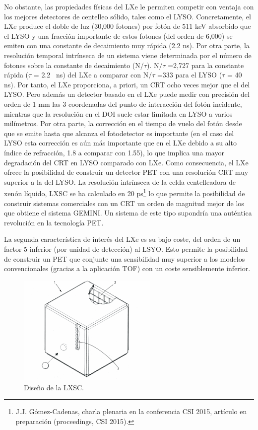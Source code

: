 No obstante, las propiedades físicas del LXe le permiten competir con ventaja con los mejores detectores de centelleo sólido, tales como el LYSO. Concretamente, el LXe produce el doble de luz (30,000 fotones) por fotón de 511 keV absorbido que el LYSO y una fracción importante de estos fotones (del orden de 6,000) se emiten con una constante de decaimiento muy rápida (2.2 ns). Por otra parte, la resolución temporal intrínseca de un sistema viene determinada por el número de fotones sobre la constante de decaimiento (N/$\tau$). N$/\tau$ =2,727 para la constante rápida ($\tau$ = 2.2~ ns) del LXe a comparar con N/$\tau$ =333 para el LYSO ($\tau$ = 40~ ns). Por tanto, el LXe proporciona, a priori, un CRT ocho veces mejor que el del LYSO. Pero además un detector basado en el LXe puede medir con precisión del orden de 1 mm las 3 coordenadas del punto de interacción del fotón incidente, mientras que la resolución en el DOI suele estar limitada en LYSO a varios milímetros. Por otra parte, la corrección en el tiempo de vuelo del fotón desde que se emite hasta que alcanza el fotodetector es importante (en el caso del LYSO esta corrección es aún más importante que en el LXe debido a su alto índice de refracción, 1.8 a comparar con 1.55), lo que implica una mayor degradación del CRT en LYSO comparado con LXe. Como consecuencia, el LXe ofrece la posibilidad de construir un detector PET con una resolución CRT muy superior a la del LYSO. La resolución intrínseca de la celda centelleadora de xenón líquido, LXSC  se ha calculado en 20 ps\footnote{J.J. Gómez-Cadenas, charla plenaria en la conferencia CSI 2015, artículo en preparación (proceedings, CSI 2015). }  lo que permite la posibilidad de construir sistemas comerciales con un CRT un orden de magnitud mejor de los que obtiene el sistema GEMINI. Un sistema de este tipo supondría una auténtica revolución en la tecnología PET.

La segunda característica de interés del LXe es su bajo coste, del orden de un factor 5 inferior (por unidad de detección) al LSYO. Esto permite la posibilidad de construir un PET que conjunte una sensibilidad muy superior a los modelos convencionales (gracias a la aplicación TOF) con un coste sensiblemente inferior. 

\begin{figure}
\centering
\includegraphics[width=0.6\textwidth]{img/LXSC2.pdf}
\caption{\small Diseño de la LXSC.} \label{fig.BOX}
\end{figure} 

